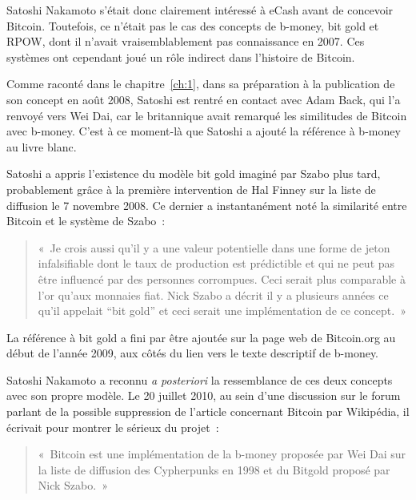 Satoshi Nakamoto s'était donc clairement intéressé à eCash avant de concevoir Bitcoin. Toutefois, ce n'était pas le cas des concepts de b-money, bit gold et RPOW, dont il n'avait vraisemblablement pas connaissance en 2007. Ces systèmes ont cependant joué un rôle indirect dans l'histoire de Bitcoin.

Comme raconté dans le chapitre~\ref{ch:1}, dans sa préparation à la publication de son concept en août 2008, Satoshi est rentré en contact avec Adam Back, qui l'a renvoyé vers Wei Dai, car le britannique avait remarqué les similitudes de Bitcoin avec b-money. C'est à ce moment-là que Satoshi a ajouté la référence à b-money au livre blanc.

Satoshi a appris l'existence du modèle bit gold imaginé par Szabo plus tard, probablement grâce à la première intervention de Hal Finney sur la liste de diffusion le 7 novembre 2008. Ce dernier a instantanément noté la similarité entre Bitcoin et le système de Szabo~:

\begin{quote}
«~Je crois aussi qu'il y a une valeur potentielle dans une forme de jeton infalsifiable dont le taux de production est prédictible et qui ne peut pas être influencé par des personnes corrompues. Ceci serait plus comparable à l'or qu'aux monnaies fiat. Nick Szabo a décrit il y a plusieurs années ce qu'il appelait “bit gold” et ceci serait une implémentation de ce concept.~»
\end{quote}

La référence à bit gold a fini par être ajoutée sur la page web de Bitcoin.org au début de l'année 2009, aux côtés du lien vers le texte descriptif de b-money.

Satoshi Nakamoto a reconnu \emph{a posteriori} la ressemblance de ces deux concepts avec son propre modèle. Le 20 juillet 2010, au sein d'une discussion sur le forum parlant de la possible suppression de l'article concernant Bitcoin par Wikipédia, il écrivait pour montrer le sérieux du projet~:

\begin{quote}
«~Bitcoin est une implémentation de la b-money proposée par Wei Dai sur la liste de diffusion des Cypherpunks en 1998 et du Bitgold proposé par Nick Szabo.~»
\end{quote}

